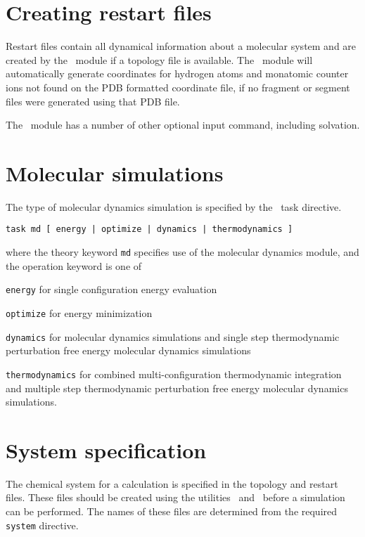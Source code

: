 \section{Creating restart files}
\label{sec:nwanwrst}

Restart files contain all dynamical information about a molecular
system and are created by the \prepare\ module if a topology file
is available. The \prepare\ module will automatically generate
coordinates for hydrogen atoms and monatomic counter ions
not found on the PDB formatted coordinate file, if no fragment or
segment files were generated using that PDB file.

The \prepare\ module has a number of other optional input command,
including solvation.

\section{Molecular simulations}
The type of molecular dynamics simulation is specified by the
\nwchem\ task directive.
\begin{verbatim}
task md [ energy | optimize | dynamics | thermodynamics ]
\end{verbatim}
where the theory keyword {\tt md} specifies use of the molecular
dynamics module, and the operation keyword is one of
\begin{description}
\item
{\tt energy} for single configuration energy evaluation
\item
{\tt optimize} for energy minimization
\item
{\tt dynamics} for molecular dynamics simulations and single step
thermodynamic perturbation free energy molecular dynamics simulations
\item
{\tt thermodynamics} for combined multi-configuration thermodynamic
integration and multiple step thermodynamic perturbation free
energy molecular dynamics simulations.
\end{description}

\section{System specification}

The chemical system for a calculation is specified in the topology
and restart files. These files should be created using the utilities
\nwtop\ and \nwrst\ before a simulation can be performed.
The names of these files are determined from the required \verb+system+ 
directive.

